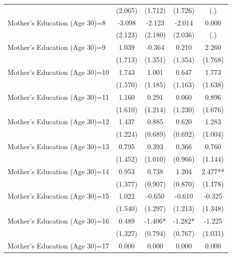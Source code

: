 \begin{table}[ht!]
{\begin{tabular}{l*{4}{c}}
                    &     (2.065)   &     (1.712)   &     (1.726)   &         (.)   \\
Mother's Education (Age 30)=8&      -3.098   &      -2.123   &      -2.014   &       0.000   \\
                    &     (2.123)   &     (2.180)   &     (2.036)   &         (.)   \\
Mother's Education (Age 30)=9&       1.039   &      -0.364   &       0.210   &       2.260   \\
                    &     (1.713)   &     (1.351)   &     (1.354)   &     (1.768)   \\
Mother's Education (Age 30)=10&       1.743   &       1.001   &       0.647   &       1.773   \\
                    &     (1.570)   &     (1.185)   &     (1.163)   &     (1.638)   \\
Mother's Education (Age 30)=11&       1.160   &       0.291   &       0.060   &       0.896   \\
                    &     (1.610)   &     (1.214)   &     (1.230)   &     (1.676)   \\
Mother's Education (Age 30)=12&       1.437   &       0.885   &       0.620   &       1.283   \\
                    &     (1.224)   &     (0.689)   &     (0.692)   &     (1.004)   \\
Mother's Education (Age 30)=13&       0.795   &       0.393   &       0.366   &       0.760   \\
                    &     (1.452)   &     (1.010)   &     (0.966)   &     (1.144)   \\
Mother's Education (Age 30)=14&       0.953   &       0.738   &       1.204   &       2.477** \\
                    &     (1.377)   &     (0.907)   &     (0.870)   &     (1.178)   \\
Mother's Education (Age 30)=15&       1.022   &      -0.650   &      -0.610   &      -0.325   \\
                    &     (1.540)   &     (1.297)   &     (1.213)   &     (1.348)   \\
Mother's Education (Age 30)=16&       0.489   &      -1.406*  &      -1.282*  &      -1.225   \\
                    &     (1.327)   &     (0.794)   &     (0.767)   &     (1.031)   \\
Mother's Education (Age 30)=17&       0.000   &       0.000   &       0.000   &       0.000   \\

\end{tabular}}
\end{table}
